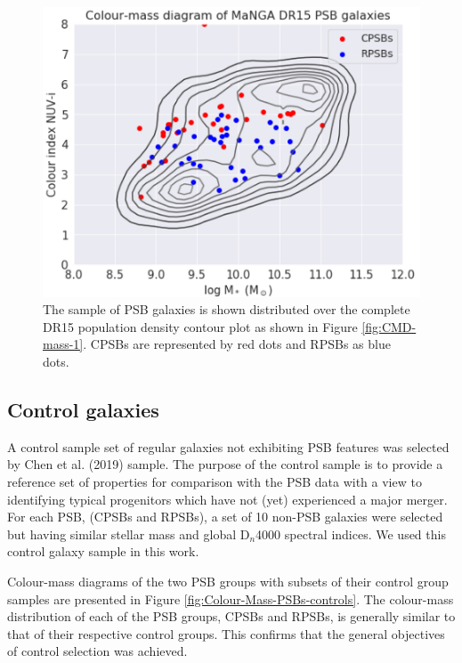 \begin{figure}
    \centering
    \includegraphics[width=\columnwidth]{images/CMDs/CMD-CPSB+RPSB-15.png}
    \caption[Colour-mass distribution of PSBs]{The sample of PSB galaxies is shown distributed over the complete DR15 population density contour plot as shown in Figure \ref{fig:CMD-mass-1}. CPSBs are represented by red dots and RPSBs as blue dots.}
    \label{fig:Colour-Mass-PSBs}
\end{figure}

\subsection{Control galaxies}
\label{sec:controls}
A control sample set of regular galaxies not exhibiting PSB features was selected by Chen et al. (2019) sample. The purpose of the control sample is to provide a reference set of properties for comparison with the PSB data with a view to identifying typical progenitors which have not (yet) experienced a major merger. For each PSB, (CPSBs and RPSBs), a set of 10 non-PSB galaxies were selected but having similar stellar mass and global D$_n$4000 spectral indices. We used this control galaxy sample in this work.

Colour-mass diagrams of the two PSB groups with subsets of their control group samples are presented in Figure \ref{fig:Colour-Mass-PSBs-controls}. The colour-mass distribution of each of the PSB groups, CPSBs and RPSBs, is generally similar to that of their respective control groups. This confirms that the general objectives of control selection was achieved.

